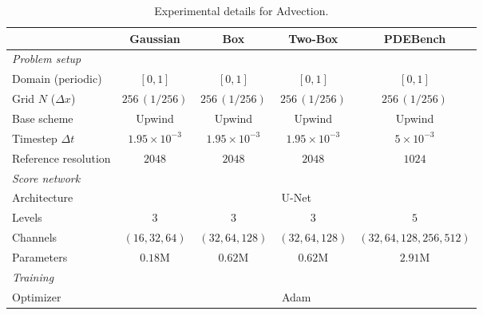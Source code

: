 \documentclass[letterpaper]{article} %
\begin{document}



\begin{table}[h]
\centering
\setlength{\tabcolsep}{4pt}
\renewcommand{\arraystretch}{1.15}
\caption{Experimental details for Advection.}
\label{tab:exp-details-advection}
\begin{tabular}{l cccc}
\toprule
& Gaussian & Box & Two-Box & PDEBench \\
\midrule
\multicolumn{5}{l}{\textit{Problem setup}}\\
Domain (periodic)    & $[0,1]$ & $[0,1]$ & $[0,1]$ & $[0,1]$ \\
Grid $N$ ($\Delta x$) & $256\,(1/256)$ & $256\,(1/256)$ & $256\,(1/256)$ & $256\,(1/256)$ \\
Base scheme          & Upwind & Upwind & Upwind & Upwind \\
Timestep $\Delta t$  & $1.95{\times}10^{-3}$ & $1.95{\times}10^{-3}$ & $1.95{\times}10^{-3}$ & $5{\times}10^{-3}$ \\
Reference resolution     & $2048$ & $2048$ & $2048$ & $1024$ \\
\midrule
\multicolumn{5}{l}{\textit{Score network}}\\
Architecture         & \multicolumn{4}{c}{U-Net \citep{ronneberger2015u}} \\
Levels               & $3$ & $3$ & $3$ & $5$ \\
Channels             & $(16,32,64)$ & $(32,64,128)$ & $(32,64,128)$ & $(32,64,128,256,512)$ \\
Parameters           & $0.18$M & $0.62$M & $0.62$M & $2.91$M \\
\midrule
\multicolumn{5}{l}{\textit{Training}}\\
Optimizer            & \multicolumn{4}{c}{Adam \citep{kingma2014adam}} \\

\end{tabular}
\end{table}
\end{document}
